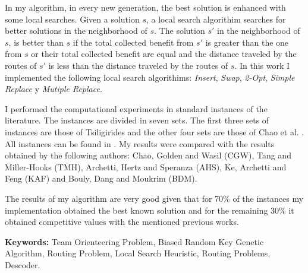 \bigskip

In my algorithm, in every new generation, the best solution is enhanced with some local searches. Given a solution $s$, a local search algorithim searches for better solutions in the neighborhood of $s$. The solution $s'$ in the neighborhood of $s$, is better than $s$ if the total collected benefit from $s'$ is greater than the one from $s$ or their total collected benefit are equal and the distance traveled by the routes of $s'$ is less than the distance traveled by the routes of $s$. In this work I implemented the following local search algorithims: \textit{Insert}, \textit{Swap}, \textit{2-Opt}, \textit{Simple Replace} y \textit{Mutiple Replace}.

\bigskip

I performed the computational experiments in standard instances of the literature. The instances are divided in seven sets. The first three sets of instances are those of Tsiligirides \cite{Tsiligirides} and the other four sets are those of Chao et al. \cite{ChaoGoldenWasil}. All instances can be found in \cite{IntancesChaoTsiligirides}. My results were compared with the results obtained by the following authors: Chao, Golden and Wasil \cite{ChaoGoldenWasil} (CGW), Tang and Miller-Hooks \cite{TangMillerHooks} (TMH), Archetti, Hertz and Speranza \cite{ArchettiHertzSperanza} (AHS), Ke, Archetti and Feng \cite{KeArchettiFeng} (KAF) and Bouly, Dang and Moukrim \cite{BoulyDangMoukrim} (BDM). 

\bigskip

The results of my algorithm are very good given that for 70\% of the instances my implementation obtained the best known solution and for the remaining 30\% it obtained competitive values with the mentioned previous works.

\bigskip

\noindent\textbf{Keywords:} Team Orienteering Problem, Biased Random Key Genetic Algorithm, Routing Problem, Local Search Heuristic, Routing Problems, Descoder.